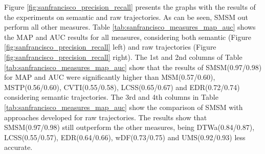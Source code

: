 \documentclass[12pt]{article}
\begin{document}
Figure {\ref{fig:sanfrancisco_precision_recall}} presents the graphs with the results of the experiments on semantic and raw trajectories. As can be seen, SMSM out perform all other measures. Table {\ref{tab:sanfrancisco_measures_map_auc}} shows the MAP and AUC results for all measures, considering both semantic (Figure \ref{fig:sanfrancisco_precision_recall} left) and raw trajectories (Figure \ref{fig:sanfrancisco_precision_recall} right). The 1st and 2nd columns of Table {\ref{tab:sanfrancisco_measures_map_auc}} show that the results of SMSM(0.97/0.98) for MAP and AUC were significantly higher than MSM(0.57/0.60), MSTP(0.56/0.60), CVTI(0.55/0.58), LCSS(0.65/0.67) and EDR(0.72/0.74) considering semantic trajectories. The 3rd and 4th columns in Table {\ref{tab:sanfrancisco_measures_map_auc}} show the comparison of SMSM with approaches developed for raw trajectories. The results show that SMSM(0.97/0.98) still outperform the other measures, being DTWa(0.84/0.87), LCSS(0.55/0.57), EDR(0.64/0.66), wDF(0.73/0.75) and UMS(0.92/0.93) less accurate.
\end{document}
